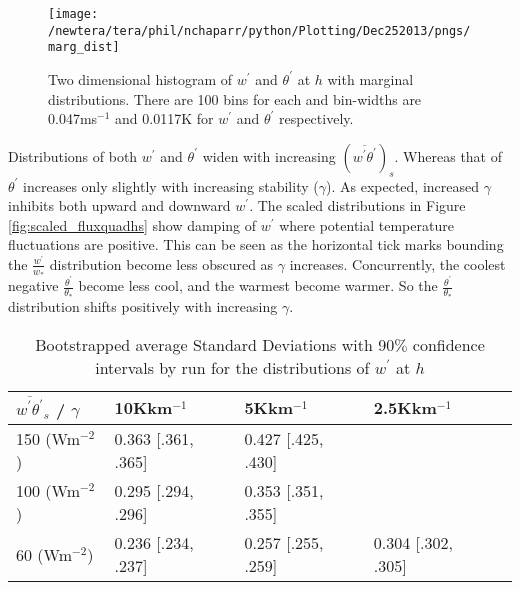 \begin{figure}[htbp]
\centering
 \texttt{[image: /newtera/tera/phil/nchaparr/python/Plotting/Dec252013/pngs/marg\_dist]}                 
\caption[]{Two dimensional histogram of $w^{'}$ and $\theta^{'}$ at $h$ with marginal distributions. There are 100 bins for each and bin-widths are 0.047ms$^{-1}$ and 0.0117K for $w^{'}$ and $\theta^{'}$ respectively.}
\label{fig:margdist}
\end{figure}

Distributions of both $w^{'}$ and $\theta^{'}$ widen with increasing $(\overline{w^{'}\theta^{'}})_{s}$.  Whereas that of $\theta^{'}$ increases only slightly with increasing stability ($\gamma$).  As expected, increased $\gamma$ inhibits both upward and downward $w^{'}$. The scaled distributions in Figure \ref{fig:scaled_fluxquadhs} show damping of $w^{'}$ where potential temperature fluctuations are positive.  This can be seen as the horizontal tick marks bounding the $\frac{w^{'}}{w_{*}}$ distribution become less obscured as $\gamma$ increases.  Concurrently, the coolest negative $\frac{\theta^{'}}{\theta_{*}}$ become less cool, and the warmest become warmer.  So the $\frac{\theta^{'}}{\theta_{*}}$ distribution shifts positively with increasing $\gamma$.\\ 


\begin{table}[htbp]
\caption[]{Bootstrapped average Standard Deviations with 90$\%$ confidence intervals by run for the distributions of $w^{'}$ at $h$}
    \begin{tabular}{ p{2.1cm} p{2.2cm}  p{2.2cm}  p{2.2cm} p{2.2cm} }
     $\overline{w^{'}\theta^{'}}_{s}$ / $\gamma$ & 10Kkm$^{-1}$ & 5Kkm$^{-1}$  & 2.5Kkm$^{-1}$   \\ \hline
     150 (Wm$^{-2}$)& 0.363 [.361, .365]& 0.427 [.425, .430] &  \\
     100 (Wm$^{-2}$)& 0.295 [.294, .296] & 0.353 [.351, .355]& \\
     60 (Wm$^{-2}$) & 0.236 [.234, .237]& 0.257 [.255, .259] & 0.304 [.302, .305]\\ \hline
     
    \end{tabular}
\label{tab:stdevw}   
\end{table}


